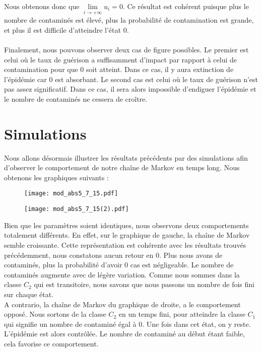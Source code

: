 \documentclass[12pt,a4paper]{report}
\theoremstyle{remark}
\begin{document}
Nous obtenons donc que $\lim\limits_{i \rightarrow +\infty} u_i = 0$. Ce résultat est cohérent puisque plus le nombre de contaminés est élevé, plus la probabilité de contamination est grande, et plus il est difficile d'atteindre l'état $0$.
\\
\\
Finalement, nous pouvons observer deux cas de figure possibles. Le premier est celui où le taux de guérison a suffisamment d'impact par rapport à celui de contamination pour que $0$ soit atteint. Dans ce cas, il y aura extinction de l'épidémie car $0$ est absorbant. Le second cas est celui où le taux de guérison n'est pas assez significatif. Dans ce cas, il sera alors impossible d'endiguer l'épidémie et le nombre de contaminés ne cessera de croître.

\section{Simulations}
\vspace{0.6cm}

Nous allons désormais illustrer les résultats précédents par des simulations afin d'observer le comportement de notre chaîne de Markov en temps long. Nous obtenons les graphiques suivants : 

\begin{figure}[h]
    \begin{minipage}[c]{0.25\linewidth}
        \centering
        \texttt{[image: mod\_abs5\_7\_15.pdf]}
    \end{minipage}
    \hfill%
    \vspace{0.1cm}
    \begin{minipage}[c]{0.50\linewidth}
        \centering
       \texttt{[image: mod\_abs5\_7\_15(2).pdf]}
    \end{minipage}
\end{figure} 

Bien que les paramètres soient identiques, nous observons deux comportements totalement différents. En effet, sur le graphique de gauche, la chaîne de Markov semble croissante. Cette représentation est cohérente avec les résultats trouvés précédemment, nous constatons aucun retour en $0$. Plus nous avons de contaminés, plus la probabilité d'avoir $0$ cas est négligeable. Le nombre de contaminés augmente avec de légère variation. Comme nous sommes dans la classe $C_2$ qui est transitoire, nous savons que nous passons un nombre de fois fini sur chaque état.
\\
A contrario, la chaîne de Markov du graphique de droite, a le comportement opposé. Nous sortons de la classe $C_2$ en un temps fini, pour atteindre la classe $C_1$ qui signifie un nombre de contaminé égal à 0. Une fois dans cet état, on y reste. L'épidémie est alors contrôlée.
Le nombre de contaminé au début étant faible, cela favorise ce comportement.
\end{document}
